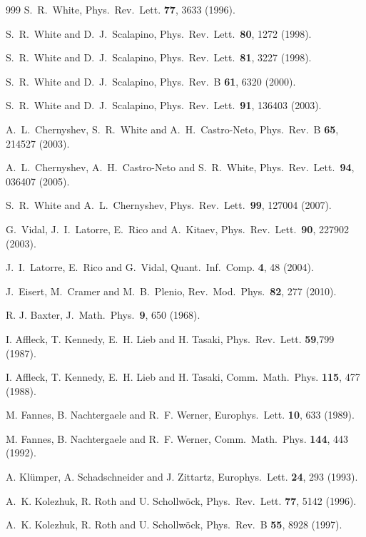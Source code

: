 \documentclass[a4paper,10pt,oneside,onecolumn,1p,times]{elsarticle}
\begin{document}
\begin{thebibliography}{999}
S.~R.~White, Phys.\ Rev.\ Lett. {\bf 77}, 3633 (1996).

S.~R.~White and D.~J.~Scalapino, Phys.\ Rev.\ Lett.\ {\bf 80}, 1272 (1998).

S.~R.~White and D.~J.~Scalapino, Phys.\ Rev.\ Lett.\ {\bf 81}, 3227 (1998).

S.~R.~White and D.~J.~Scalapino, Phys.\ Rev.\ B {\bf 61}, 6320 (2000).

S.~R.~White and D.~J.~Scalapino, Phys.\ Rev.\ Lett.\ {\bf 91}, 136403 (2003).

A.~L.~Chernyshev, S.~R.~White and A.~H.~Castro-Neto, Phys.\ Rev.\ B {\bf 65}, 214527 (2003).

A.~L.~Chernyshev, A.~H.~Castro-Neto and S.~R.~White, Phys.\ Rev.\ Lett.\ {\bf 94}, 036407 (2005).

S.~R.~White and A.~L.~Chernyshev, Phys.\ Rev.\ Lett.\ {\bf 99}, 127004 (2007).

G.~Vidal, J.~I.~Latorre, E.~Rico and A.~Kitaev, Phys.\ Rev.\ Lett.\ {\bf 90}, 227902 (2003).

J.~I.~Latorre, E.~Rico and G.~Vidal, Quant.\ Inf.\ Comp. {\bf 4}, 48 (2004).

J.~Eisert, M.~Cramer and M.~B.~Plenio, Rev.\ Mod.\ Phys.\ {\bf 82}, 277 (2010).

R. J. Baxter, J.\ Math.\ Phys.\ {\bf 9}, 650 (1968).

I. Affleck, T. Kennedy, E.~H. Lieb and H. Tasaki, Phys.\ Rev.\ Lett. {\bf 59},799 (1987).

I. Affleck, T. Kennedy, E.~H. Lieb and H. Tasaki, Comm.\ Math.\ Phys. {\bf 115}, 477 (1988).

M. Fannes, B. Nachtergaele and R.~F. Werner, Europhys.\ Lett. {\bf 10}, 633 (1989).

M. Fannes, B. Nachtergaele and R.~F. Werner,
Comm.\ Math.\ Phys. {\bf 144}, 443 (1992).

A. Kl\"{u}mper, A. Schadschneider and J. Zittartz,
Europhys.\ Lett. {\bf 24}, 293 (1993).

A.~K. Kolezhuk, R. Roth and U. Schollw\"{o}ck, Phys.\ Rev.\ Lett. {\bf 77}, 5142 (1996).

A.~K. Kolezhuk, R. Roth and U. Schollw\"{o}ck, Phys.\ Rev.\ B {\bf 55}, 8928 (1997).


\end{thebibliography}
\end{document}
